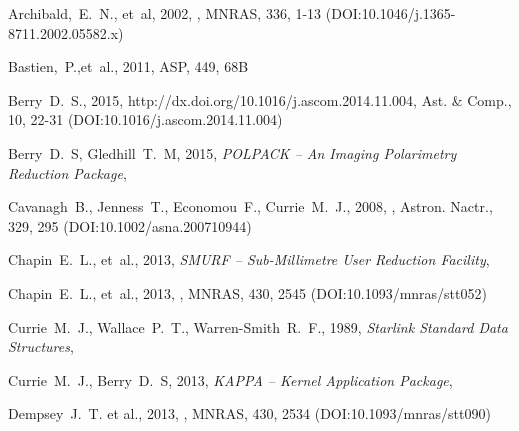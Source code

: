 \documentclass[11pt,oneside,chapters]{starlink}
\begin{document}
\newpage

\newpage

\newpage

\newpage

\newpage

\newpage

\newpage
\begin{thebibliography}{}



Archibald,~E.~N., et~al, 2002, , MNRAS, 336, 1-13
(DOI:10.1046/j.1365-8711.2002.05582.x)

Bastien,~P.,et~al., 2011,  ASP, 449, 68B

Berry~D.~S.,  2015,
{http://dx.doi.org/10.1016/j.ascom.2014.11.004},
Ast. \& Comp., 10, 22-31 (DOI:10.1016/j.ascom.2014.11.004)

Berry~D.~S, Gledhill~T.~M, 2015, \textit{POLPACK -- An Imaging Polarimetry Reduction Package},

Cavanagh~B., Jenness~T., Economou~F., Currie~M.~J., 2008,
, Astron. Nactr., 329, 295
(DOI:10.1002/asna.200710944)

Chapin~E.~L., et~al., 2013, \textit{SMURF -- Sub-Millimetre User Reduction
Facility}, 

Chapin~E.~L., et~al., 2013,
,
MNRAS, 430, 2545 (DOI:10.1093/mnras/stt052)

Currie~M.~J., Wallace~P.~T., Warren-Smith~R.~F., 1989,
\textit{Starlink Standard Data Structures}, 

Currie~M.~J., Berry~D.~S, 2013, \textit{KAPPA -- Kernel Application Package},

Dempsey~J.~T. et al., 2013, ,
MNRAS, 430, 2534 (DOI:10.1093/mnras/stt090)


\end{thebibliography}
\end{document}
